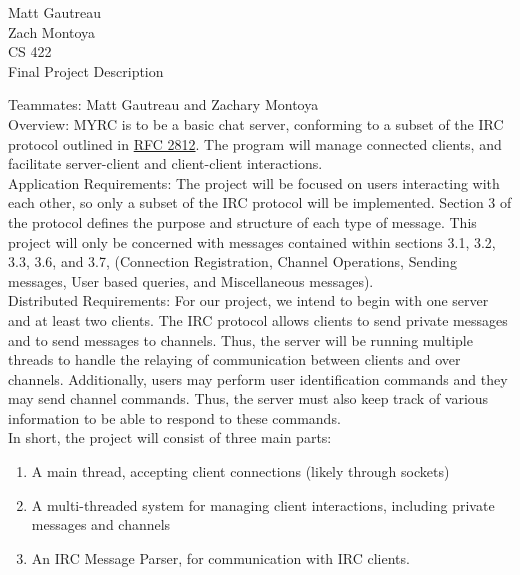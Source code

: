 \documentclass{article}
\begin{document}
\begin{flushright}
    Matt Gautreau\\
    Zach Montoya\\
    CS 422\\
    Final Project Description
\end{flushright}


Teammates: Matt Gautreau and Zachary Montoya\\

Overview: MYRC is to be a basic chat server, conforming to a subset of the IRC
protocol outlined in \href{https://tools.ietf.org/html/rfc2812}{RFC 2812}.  The
program will manage connected clients, and facilitate server-client and
client-client interactions.\\

Application Requirements: The project will be focused on users interacting
with each other, so only a subset of the IRC protocol will be implemented.
Section 3 of the protocol defines the purpose and structure of each type of
message. This project will only be concerned with messages contained within
sections 3.1, 3.2, 3.3, 3.6, and 3.7, (Connection Registration, Channel
Operations, Sending messages, User based queries, and Miscellaneous
messages).\\

Distributed Requirements: For our project, we intend to begin with one server
and at least two clients. The IRC protocol allows clients to send private
messages and to send messages to channels. Thus, the server will be running
multiple threads to handle the relaying of communication between clients and
over channels. Additionally, users may perform user identification commands and
they may send channel commands. Thus, the server must also keep track of
various information to be able to respond to these commands.\\

In short, the project will consist of three main parts:

\begin{enumerate}
    \item
        A main thread, accepting client connections (likely through sockets)
    \item
        A multi-threaded system for managing client interactions, including
        private messages and channels
    \item
        An IRC Message Parser, for communication with IRC clients.
\end{enumerate}
\end{document}
